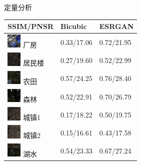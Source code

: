 \begin{frame}{定量分析}
    \begin{table}[h]
        \centering
        \begin{tabular}{ m{3cm} | m{3cm} | m{3cm}  }
            \hline
            \scriptsize{SSIM/PNSR} & \scriptsize{Bicubic} & \scriptsize{ESRGAN} \\ \hline       
            \includegraphics[height=0.7cm]{pic/chap020301.png} \scriptsize{厂房}
            & \scriptsize{0.33/17.06}
            & \scriptsize{0.72/21.95} \\ 
            \hline
            \includegraphics[height=0.7cm]{pic/chap020302.png} \scriptsize{居民楼}
            & \scriptsize{0.27/19.60}
            & \scriptsize{0.52/22.99} \\
            \hline
            \includegraphics[height=0.7cm]{pic/chap020303.png} \scriptsize{农田}
            & \scriptsize{0.57/24.25}
            & \scriptsize{0.76/28.40} \\
            \hline
            \includegraphics[height=0.7cm]{pic/chap020304.png} \scriptsize{森林}
            & \scriptsize{0.52/22.91}
            & \scriptsize{0.70/26.79} \\
            \hline
            \includegraphics[height=0.7cm]{pic/chap020305.png} \scriptsize{城镇1}
            & \scriptsize{0.17/18.22}
            & \scriptsize{0.50/19.75} \\
            \hline
            \includegraphics[height=0.7cm]{pic/chap020306.png} \scriptsize{城镇2}
            & \scriptsize{0.15/16.61}
            & \scriptsize{0.43/17.58} \\
            \hline
            \includegraphics[height=0.7cm]{pic/chap020307.png} \scriptsize{湖水}
            & \scriptsize{0.54/23.33}
            & \scriptsize{0.67/27.24} \\
            \hline
        \end{tabular}
        
      \end{table}
    
\end{frame}

